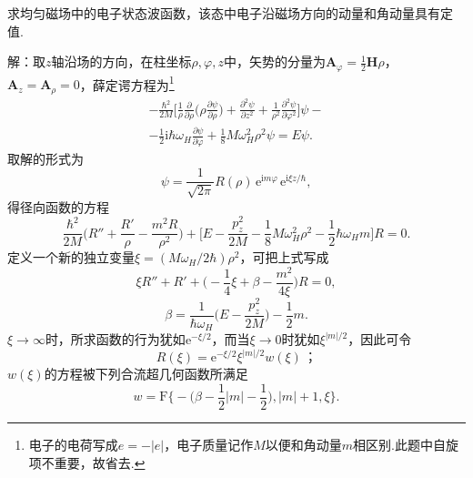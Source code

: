 \begin{xiti}

\quad 求均匀磁场中的电子状态波函数，该态中电子沿磁场方向的动量和角动量具有定值.

解：取$z$轴沿场的方向，在柱坐标$\rho,\varphi,z$中，矢势的分量为$\boldsymbol{A}_\varphi=\frac{1}{2}\boldsymbol{H}\rho$，$\boldsymbol{A}_z=\boldsymbol{A}_\rho=0$，薛定谔方程为\footnote{电子的电荷写成$e=-|e|$，电子质量记作$M$以便和角动量$m$相区别.此题中自旋项不重要，故省去.}
\setcounter{equation}{0}\renewcommand{\theequation}{\arabic{equation}}%
\begin{equation}
\begin{aligned}
  -\frac{\hbar^2}{2M}\biggl[\frac{1}{\rho}\frac{\partial}{\partial\rho}
  \biggl(\rho\frac{\partial\psi}{\partial\rho}\biggr)
  +\frac{\partial^2\psi}{\partial z^2}
  +\frac{1}{\rho^2}\frac{\partial^2\psi}{\partial\varphi^2}\biggr]\psi-\\
  -\frac{1}{2}\mathrm{i}\hbar\omega_H\frac{\partial\psi}{\partial\varphi}
  +\frac{1}{8}M\omega_H^2\rho^2\psi=E\psi.
\end{aligned}
\end{equation}
取解的形式为
\begin{equation*}
  \psi=\frac{1}{\sqrt{2\pi}}R(\rho)\,\mathrm{e}^{\mathrm{i}m\varphi}\,\mathrm{e}^{\mathrm{i}\xi z/\hbar},
\end{equation*}
得径向函数的方程
\begin{equation*}
  \frac{\hbar^2}{2M}\biggl(R''+\frac{R'}{\rho}-\frac{m^2R}{\rho^2}\biggr)
  +\biggl[E-\frac{p_z^2}{2M}-\frac{1}{8}M\omega_H^2\rho^2
  -\frac{1}{2}\hbar\omega_H m\biggr]R=0.
\end{equation*}
定义一个新的独立变量$\xi=(M\omega_H/2\hbar)\rho^2$，可把上式写成
\begin{equation*}
  \xi R''+R'+\biggl(-\frac{1}{4}\xi+\beta-\frac{m^2}{4\xi}\biggr)R=0,
\end{equation*}
\begin{equation*}
  \beta=\frac{1}{\hbar\omega_H}\biggl(E-\frac{p_z^2}{2M}\biggr)-\frac{1}{2}m.
\end{equation*}
$\xi\to\infty$时，所求函数的行为犹如$\mathrm{e}^{-\xi/2}$，而当$\xi\to0$时犹如$\xi^{|m|/2}$，因此可令
\begin{equation*}
  R(\xi)=\mathrm{e}^{-\xi/2}\xi^{|m|/2}w(\xi)\,\text{；}
\end{equation*}
$w(\xi)$的方程被下列合流超几何函数所满足
\begin{equation*}
  w=\mathrm{F}\biggl\{-\biggl(\beta-\frac{1}{2}|m|-\frac{1}{2}\biggr),|m|+1,\xi\biggr\}.

\end{equation*}
\end{xiti}
